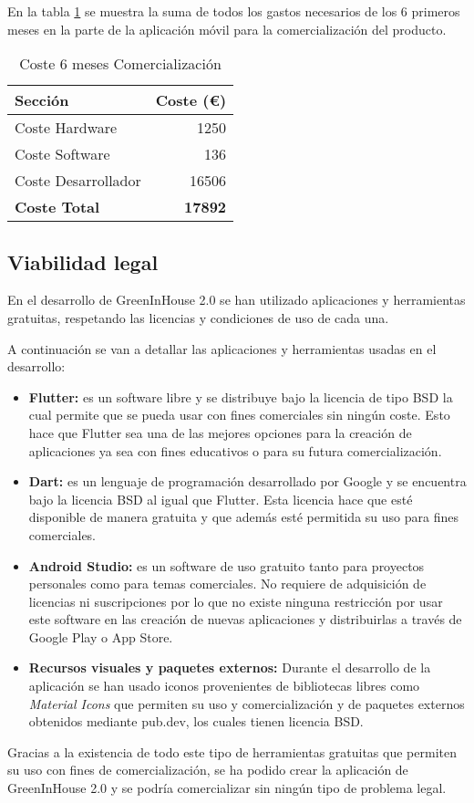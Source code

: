 En la tabla \ref{tab:CosteTotalCom} se muestra la suma de todos los gastos necesarios de los 6 primeros meses en la parte de la aplicación móvil para la comercialización del producto.

\begin{table}[H]
\centering
\begin{tabular}{|l|r|}
\hline
\textbf{Sección} & \textbf{Coste (€)} \\ \hline
Coste Hardware & 1250 \\ \hline
Coste Software & 136 \\ \hline
Coste Desarrollador & 16506 \\ \hline
\textbf{Coste Total} & \textbf{17892} \\ \hline
\end{tabular}
\caption{Coste 6 meses Comercialización}
\label{tab:CosteTotalCom}
\end{table}


\subsection{Viabilidad legal}

En el desarrollo de GreenInHouse 2.0 se han utilizado aplicaciones y herramientas gratuitas, respetando las licencias y condiciones de uso de cada una.

A continuación se van a detallar las aplicaciones y herramientas usadas en el desarrollo:

\begin{itemize}
    \item \textbf{Flutter:} es un software libre y se distribuye bajo la licencia de tipo BSD la cual permite que se pueda usar con fines comerciales sin ningún coste. Esto hace que Flutter sea una de las mejores opciones para la creación de aplicaciones ya sea con fines educativos o para su futura comercialización.
    \item \textbf{Dart:} es un lenguaje de programación desarrollado por Google y se encuentra bajo la licencia BSD al igual que Flutter. Esta licencia hace que esté disponible de manera gratuita y que además esté permitida su uso para fines comerciales.
    \item \textbf{Android Studio:} es un software de uso gratuito tanto para proyectos personales como para temas comerciales. No requiere de adquisición de licencias ni suscripciones por lo que no existe ninguna restricción por usar este software en las creación de nuevas aplicaciones y distribuirlas a través de Google Play o App Store.
    \item \textbf{Recursos visuales y paquetes externos:} Durante el desarrollo de la aplicación se han usado iconos provenientes de bibliotecas libres como \textit{Material Icons} que permiten su uso y comercialización y de paquetes externos obtenidos mediante pub.dev, los cuales tienen licencia BSD.
\end{itemize}

Gracias a la existencia de todo este tipo de herramientas gratuitas que permiten su uso con fines de comercialización, se ha podido crear la aplicación de GreenInHouse 2.0 y se podría comercializar sin ningún tipo de problema legal.


